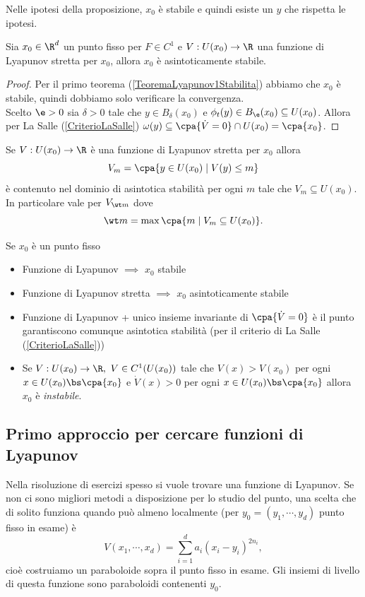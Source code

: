 \begin{remark}
Nelle ipotesi della proposizione, $x_0$ \`e stabile e quindi esiste un $y$ che rispetta le ipotesi.
\end{remark}

\begin{theorem}\label{TeoremaLyapunov2AsintoticaStabilita}
Sia $x_0\in \R^d$ un punto fisso per $F\in C^1$ e $V:U(x_0)\to\R$ una funzione di Lyapunov stretta per $x_0$, allora $x_0$ \`e asintoticamente stabile.
\end{theorem}
\begin{proof}
Per il primo teorema (\ref{TeoremaLyapunov1Stabilita}) abbiamo che $x_0$ \`e stabile, quindi dobbiamo solo verificare la convergenza.\\
Scelto $\e>0$ sia $\delta>0$ tale che $y\in B_\delta(x_0)$ e $\phi_t(y)\in B_\e(x_0)\subseteq U(x_0)$. Allora per La Salle (\ref{CriterioLaSalle}) $\omega(y)\subseteq \cpa{\dot V=0}\cap U(x_0)=\cpa{x_0}$.
\end{proof}

\begin{remark}
Se $V:U(x_0)\to\R$ \`e una funzione di Lyapunov stretta per $x_0$ allora
\[V_m=\cpa{y\in U(x_0)\mid V(y)\leq m}\]
\`e contenuto nel dominio di asintotica stabilit\`a per ogni $m$ tale che $V_{m}\subseteq U(x_0)$. In particolare vale per $V_{\wt m}$ dove
\[\wt m=\max\cpa{m\mid V_{m}\subseteq U(x_0)}.\]
\end{remark}

\begin{remark}
Se $x_0$ \`e un punto fisso
\setlength{\leftmargini}{0.5cm}
\begin{itemize}
\item Funzione di Lyapunov $\implies$ $x_0$ stabile
\item Funzione di Lyapunov stretta $\implies$ $x_0$ asintoticamente stabile
\item Funzione di Lyapunov + unico insieme invariante di $\cpa{\dot V=0}$ \`e il punto garantiscono comunque asintotica stabilit\`a (per il criterio di La Salle (\ref{CriterioLaSalle}))
\item Se $V:U(x_0)\to \R,\ V\in C^1(U(x_0))$ tale che $V(x)>V(x_0)$ per ogni $x\in U(x_0)\bs\cpa{x_0}$ e $\dot V(x)>0$ per ogni $x\in U(x_0)\bs\cpa{x_0}$ allora $x_0$ \`e \textit{instabile}.
\end{itemize}
\end{remark}

\subsection{Primo approccio per cercare funzioni di Lyapunov}
Nella risoluzione di esercizi spesso si vuole trovare una funzione di Lyapunov. Se non ci sono migliori metodi a disposizione per lo studio del punto, una scelta che di solito funziona quando pu\`o almeno localmente (per $y_0=(y_1,\cdots, y_d)$ punto fisso in esame) \`e
\[V(x_1,\cdots, x_d)=\sum_{i=1}^d a_i (x_i-y_i)^{2n_i},\]
cio\`e costruiamo un paraboloide sopra il punto fisso in esame. Gli insiemi di livello di questa funzione sono paraboloidi contenenti $y_0$.